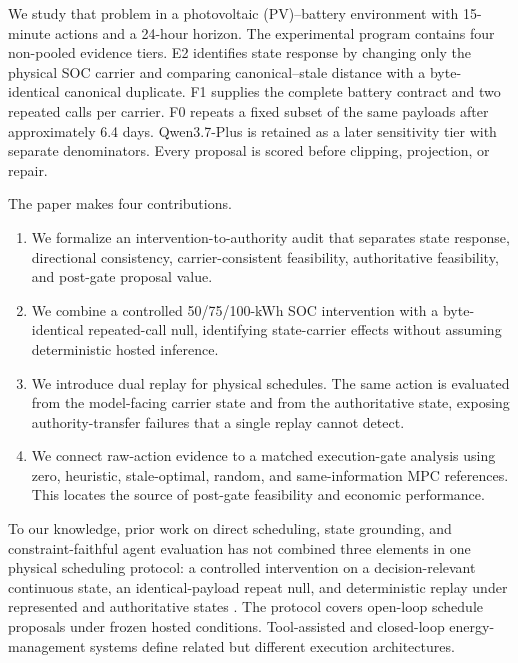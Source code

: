 \documentclass[11pt]{article}
\begin{document}
We study that problem in a photovoltaic (PV)--battery environment with 15-minute actions and a
24-hour horizon. The experimental program contains four non-pooled evidence tiers. E2 identifies
state response by changing only the physical SOC carrier and comparing canonical--stale distance
with a byte-identical canonical duplicate. F1 supplies the complete battery contract and two
repeated calls per carrier. F0 repeats a fixed subset of the same payloads after approximately
6.4 days. Qwen3.7-Plus is retained as a later sensitivity tier with separate denominators. Every
proposal is scored before clipping, projection, or repair.

The paper makes four contributions.
\begin{enumerate}[leftmargin=*,itemsep=2pt,topsep=4pt]
  \item We formalize an intervention-to-authority audit that separates state response,
  directional consistency, carrier-consistent feasibility, authoritative feasibility, and
  post-gate proposal value.
  \item We combine a controlled 50/75/100-kWh SOC intervention with a byte-identical repeated-call
  null, identifying state-carrier effects without assuming deterministic hosted inference.
  \item We introduce dual replay for physical schedules. The same action is evaluated from the
  model-facing carrier state and from the authoritative state, exposing authority-transfer
  failures that a single replay cannot detect.
  \item We connect raw-action evidence to a matched execution-gate analysis using zero, heuristic,
  stale-optimal, random, and same-information MPC references. This locates the source of post-gate
  feasibility and economic performance.
\end{enumerate}

To our knowledge, prior work on direct scheduling, state grounding, and constraint-faithful agent
evaluation has not combined three elements in one physical scheduling protocol: a controlled
intervention on a decision-relevant continuous state, an identical-payload repeat null, and
deterministic replay under represented and authoritative states
\cite{jiang2026poweratlas,sharma2026schedbench,wang2025groundact,sheng2026envtrust,chao2026stale}.
The protocol covers open-loop schedule proposals under frozen hosted conditions. Tool-assisted and
closed-loop energy-management systems define related but different execution architectures.
\end{document}
